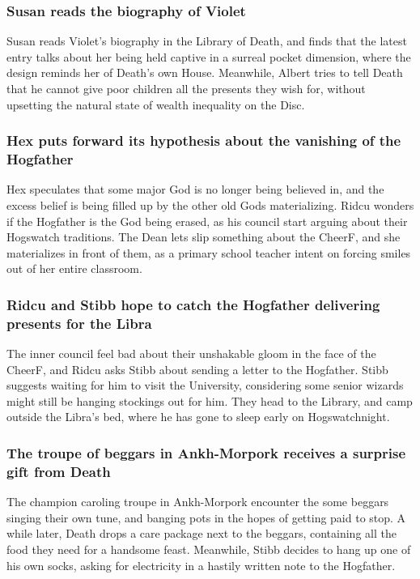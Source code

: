 \subsubsection{\Gls{Susan} reads the biography of \Gls{Violet}}
\Gls{Susan} reads \Gls{Violet}'s biography in the Library of \Gls{Death}, and finds that the latest
entry talks about her being held captive in a surreal pocket dimension, where the design reminds her
of \Gls{Death}'s own House. Meanwhile, \Gls{Albert} tries to tell \Gls{Death} that he cannot give
poor children all the presents they wish for, without upsetting the natural state of wealth
inequality on the Disc.

\subsubsection{\Gls{Hex} puts forward its hypothesis about the vanishing of the Hogfather}
\Gls{Hex} speculates that some major God is no longer being believed in, and the excess belief is
being filled up by the other old Gods materializing. \Gls{Ridcu} wonders if the Hogfather is the
God being erased, as his council start arguing about their Hogswatch traditions. The \Gls{Dean}
lets slip something about the \Gls{CheerF}, and she materializes in front of them, as a primary
school teacher intent on forcing smiles out of her entire classroom.

\subsubsection{\Gls{Ridcu} and \Gls{Stibb} hope to catch the Hogfather delivering presents for the
    \Gls{Libra}}
The inner council feel bad about their unshakable gloom in the face of the \Gls{CheerF}, and
\Gls{Ridcu} asks \Gls{Stibb} about sending a letter to the Hogfather. \Gls{Stibb} suggests waiting
for him to visit the University, considering some senior wizards might still be hanging stockings
out for him. They head to the Library, and camp outside the \Gls{Libra}'s bed, where he has gone to
sleep early on Hogswatchnight.

\subsubsection{The troupe of beggars in Ankh-Morpork receives a surprise gift from \Gls{Death}}
The champion caroling troupe in Ankh-Morpork encounter the some beggars singing their own tune,
and banging pots in the hopes of getting paid to stop. A while later, \Gls{Death} drops a care
package next to the beggars, containing all the food they need for a handsome feast. Meanwhile,
\Gls{Stibb} decides to hang up one of his own socks, asking for electricity in a hastily written
note to the Hogfather.

